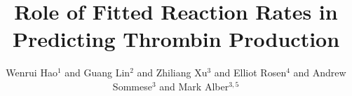 \documentclass[10pt]{ctextemp_bmc_article}
\newenvironment{bmcformat}{\baselineskip20pt\sloppy\setboolean{publ}{false}}{\baselineskip20pt\sloppy}
\begin{document}
\begin{bmcformat}


\title{Role of Fitted Reaction Rates in Predicting
Thrombin Production}



\author{Wenrui Hao$^1$%
       and
         Guang Lin$^2$%
        and
         Zhiliang Xu$^3$%
         and
         Elliot Rosen$^4$%
        and
         Andrew Sommese\correspondingauthor$^3$%
        and
         Mark Alber\correspondingauthor$^{3,5}$%
      }



\address{%
    \iid(1) Mathematical Biosciences Institute, The Ohio State University, Columbus, OH, 43210 \\
    \iid(2) Computational Mathematics Group, Pacific Northwest National
Laboratory, 902 Battelle Boulevard, Richland, WA 99352\\
    \iid(3) Department of Applied and Computational Mathematics and
Statistics, University of Notre Dame, Notre Dame, IN 46556\\
    \iid(4) Department of Medical and Molecular Genetics,
Indiana University School of Medicine\\
    \iid(5) Department of Medicine, Indiana University School of Medicine
}%

\maketitle
\begin{abstract}

\end{abstract}




\end{bmcformat}
\end{document}
